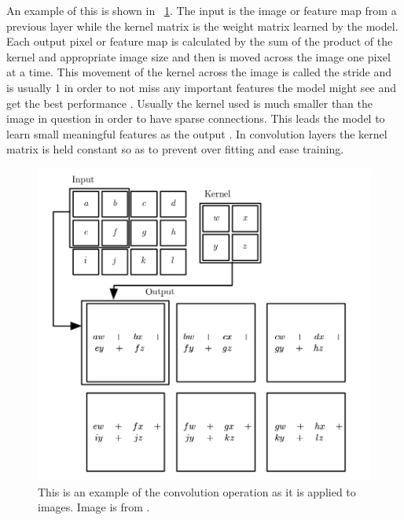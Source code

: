     An example of this is shown in ~\ref{fig_convolutionOperation}. 
    The input is the image or feature map from a previous layer while the kernel matrix is the weight matrix learned by the model. 
    Each output pixel or feature map is calculated by the sum of the product of the kernel and appropriate image size and then is moved across the image one pixel at a time. 
    This movement of the kernel across the image is called the stride and is usually 1 in order to not miss any important features the model might see and get the best performance \cite{pmlr-v15-coates11a}. 
    Usually the kernel used is much smaller than the image in question in order to have sparse connections.
    This leads the model to learn small meaningful features as the output \cite{Goodfellow-et-al-2016}. 
    In convolution layers the kernel matrix is held constant so as to prevent over fitting and ease training. 

\begin{figure}[tbh]
\centering
\includegraphics[width=\textwidth]{convolution_operation.png}
\caption{This is an example of the convolution operation as it is applied to images. Image is from \cite{Goodfellow-et-al-2016}.}
\label{fig_convolutionOperation}
\end{figure} 


